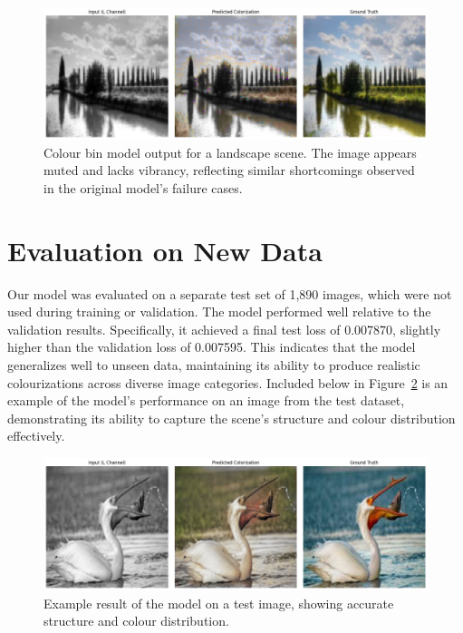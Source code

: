 \documentclass{article} %
\begin{document}
\begin{figure}[htbp]
  \centering
  \includegraphics[width=0.9\linewidth]{Figs/colour-bins-landscape.jpg}
  \caption{Colour bin model output for a landscape scene. The image appears muted and lacks vibrancy, reflecting similar shortcomings observed in the original model's failure cases.}
  \label{fig:colour-bins-landscape}
\end{figure}

\section{Evaluation on New Data}
\label{new_data}

Our model was evaluated on a separate test set of 1,890 images, which were not used during training or validation. The model performed well relative to the validation results. Specifically, 
it achieved a final test loss of 0.007870, slightly higher than the validation loss of 0.007595. This indicates that the model generalizes well to unseen data, maintaining its ability to 
produce realistic colourizations across diverse image categories. Included below in Figure~\ref{fig:test-data-example} is an example of the model's performance on an image from the test 
dataset, demonstrating its ability to capture the scene's structure and colour distribution effectively.

\begin{figure}[htbp]
  \centering
  \includegraphics[width=0.95\linewidth]{Figs/test_data_result_example.png}
  \caption{Example result of the model on a test image, showing accurate structure and colour distribution.}
  \label{fig:test-data-example}
\end{figure}
\end{document}

